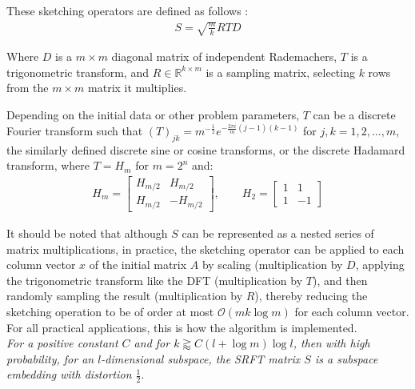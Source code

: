\documentclass{article}
\newcommand{\bO}{\mathcal{O}}
\begin{document}
These sketching operators are defined as follows \cite{halko2010findingstructurerandomnessprobabilistic}:
\begin{align*}
    S = \sqrt{\frac mk}RTD
\end{align*}

Where $D$ is a $m \times m$ diagonal matrix %
of independent Rademachers, $T$ is a trigonometric transform, and $R \in \mathbb{R}^{k \times m}$ is a sampling matrix, selecting $k$ rows from the $m \times m$ matrix it multiplies.

Depending on the initial data or other problem parameters, $T$ can be a discrete Fourier transform such that $(T)_{jk} = m^{-\frac12}e^{-\frac{2\pi i}{m}(j-1)(k-1)}$ for $j, k = 1, 2, \dots, m$, the similarly defined discrete sine or cosine transforms, or the discrete Hadamard transform, where $T = H_m$ for $m = 2^n$ and:\\
\begin{align*}
    H_m = \begin{bmatrix} H_{m/2} & H_{m/2} \\ H_{m/2} & -H_{m/2} \end{bmatrix}, \qquad H_2 =  \begin{bmatrix} 1 & 1 \\ 1 & -1 \end{bmatrix}
\end{align*}

It should be noted that although $S$ can be represented as a nested series of matrix multiplications, in practice, the sketching operator can be applied to each column vector $x$ of the initial matrix $A$ by scaling (multiplication by $D$, applying the trigonometric transform like the DFT (multiplication by $T$), and then randomly sampling the result (multiplication by $R$), thereby reducing the sketching operation to be of order at most $\bO(mk\log m)$ for each column vector. For all practical applications, this is how the algorithm is implemented.\\


\textit{For a positive constant $C$ and for $k \gtrapprox C (l + \log m) \log l$, then with high probability, for an $l$-dimensional subspace, the SRFT matrix $S$ is a subspace embedding with distortion $\frac12$}\cite{tropp_2023_0na16-j0x38}.\\
\end{document}

